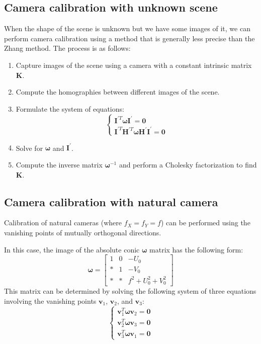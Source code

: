 \subsection{Camera calibration with unknown scene}
When the shape of the scene is unknown but we have some images of it, we can perform camera calibration using a method that is generally less precise than the Zhang method. 
The process is as follows:
\begin{enumerate}
    \item Capture images of the scene using a camera with a constant intrinsic matrix $\mathbf{K}$.
    \item Compute the homographies between different images of the scene.
    \item Formulate the system of equations:
        \[\begin{cases}\mathbf{I}^{\prime T}\boldsymbol{\omega}\mathbf{I}^{\prime}=\mathbf{0} \\ \mathbf{I}^{\prime T}\mathbf{H}^{\prime T}\boldsymbol{\omega}\mathbf{H}^{\prime}\mathbf{I}^{\prime}=\mathbf{0}\end{cases}\]
    \item Solve for $\boldsymbol{\omega}$ and $\mathbf{I}^{\prime}$. 
    \item Compute the inverse matrix $\boldsymbol{\omega}^{-1}$ and perform a Cholesky factorization to find $\mathbf{K}$.
\end{enumerate}

\subsection{Camera calibration with natural camera}
Calibration of natural cameras (where $f_X=f_Y=f$) can be performed using the vanishing points of mutually orthogonal directions.

In this case, the image of the absolute conic $\boldsymbol{\omega}$ matrix has the following form:
\[\boldsymbol{\omega}=\begin{bmatrix} 1 & 0 & -U_0 \\ \ast & 1 & -V_0 \\ \ast & \ast & f^2+U_0^2+V_0^2 \end{bmatrix}\]
This matrix can be determined by solving the following system of three equations involving the vanishing points $\mathbf{v}_1$, $\mathbf{v}_2$, and $\mathbf{v}_3$:
\[\begin{cases} \mathbf{v}_1^T\boldsymbol{\omega}\mathbf{v}_2=\mathbf{0} \\ \mathbf{v}_2^T\boldsymbol{\omega}\mathbf{v}_3=\mathbf{0} \\ \mathbf{v}_3^T\boldsymbol{\omega}\mathbf{v}_1=\mathbf{0} \end{cases}\]

